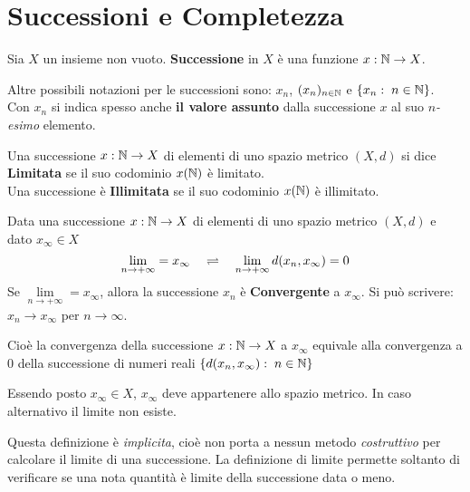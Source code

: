 \section{Successioni e Completezza}\label{sect:succ_compl}
\begin{definition}[Successione]
	\label{def:succ}
	Sia $X$ un insieme non vuoto. \textbf{Successione} in $X$ è una funzione $x: \mathbb{N} \to X$.
	\begin{note}
		Altre possibili notazioni per le successioni sono: $x_n$, $(x_n)_{n \in \mathbb{N}}$ e $\left\{x_n:\; n \in \mathbb{N}\right\}$.\\
		Con $x_n$ si indica spesso anche \textbf{il valore assunto} dalla successione $x$ al suo $n$\textit{-esimo} elemento.
	\end{note}
\end{definition}
\begin{definition}
	Una successione $x: \mathbb{N} \to X$ di elementi di uno spazio metrico $(X,d)$ si dice \textbf{Limitata} se il suo codominio $x(\mathbb{N})$ è limitato.\\
	Una successione è \textbf{Illimitata} se il suo codominio $x(\mathbb{N})$ è illimitato.
\end{definition}
\begin{definition}[Limite per Successioni] %
	\label{def:lim_succ}
	Data una successione $x: \mathbb{N} \to X$ di elementi di uno spazio metrico $(X,d)$ e dato $x_\infty \in X$
	\begin{equation}
		\label{eq:lim_succ}
		\lim\limits_{n \to +\infty} = x_\infty \quad \rightleftharpoons \quad \lim\limits_{n \to +\infty} d(x_n,x_\infty) = 0
	\end{equation}
	Se $\lim\limits_{n \to +\infty} = x_\infty$, allora la successione $x_n$ è \textbf{Convergente} a $x_\infty$. Si può scrivere: $x_n \to x_\infty$ per $n \to \infty$.

	Cioè la convergenza della successione $x: \mathbb{N} \to X$ a $x_\infty$ equivale alla convergenza a $0$ della successione di numeri reali $\left\{d(x_n,x_\infty):\; n \in \mathbb{N}\right\}$
	\begin{note}
		Essendo posto $x_\infty \in X$, $x_\infty$ deve appartenere allo spazio metrico. In caso alternativo il limite non esiste.
	\end{note}
	\begin{note}
		Questa definizione è \textit{implicita}, cioè non porta a nessun metodo \textit{costruttivo} per calcolare il limite di una successione. La definizione di limite permette soltanto di verificare se una nota quantità è limite della successione data o meno.
	\end{note}
\end{definition}
